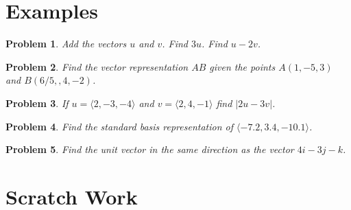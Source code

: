 \documentclass[11pt]{article}
\newtheorem{problem}{Problem}
\begin{document}
\section{Examples}

\begin{problem}
    Add the vectors $u$ and $v$. Find $3u$. Find $u-2v$.
\end{problem}

\vspace{3cm}

\begin{problem}
    Find the vector representation $AB$ given the points $A(1,-5,3)$ and $B(6/5,,4, -2)$.
\end{problem}

\vspace{2cm}


\begin{problem}
    If $u = \langle 2,-3,-4 \rangle$ and $v = \langle 2,4,-1 \rangle$ find $|2u-3v|$.
\end{problem}


\vspace{3cm}

\begin{problem}
Find the standard basis representation of $\langle -7.2,3.4,-10.1 \rangle$.
\end{problem}

\vspace{1cm}

\begin{problem}
    Find the unit vector in the same direction as the vector $4i-3j-k$.
\end{problem}

\vspace{4cm}


\section{Scratch Work}
\end{document}
